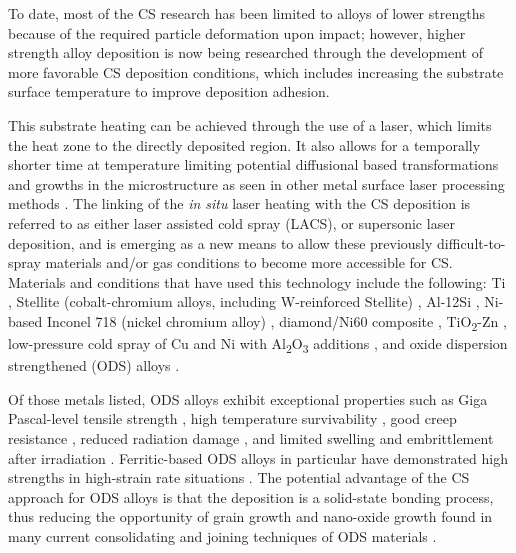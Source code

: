 	To date, most of the CS research has been limited to alloys of lower strengths because of the required particle deformation upon impact; however, higher strength alloy deposition is now being researched through the development of more favorable CS deposition conditions, which includes increasing the substrate surface temperature to improve deposition adhesion.  


	This substrate heating can be achieved through the use of a laser, which limits the heat zone to the directly deposited region. It also allows for a temporally shorter time at temperature limiting potential diffusional based transformations and growths in the microstructure as seen in other metal surface laser processing methods \cite{RN765}. The linking of the \textit{in situ} laser heating with the CS deposition is referred to as either laser assisted cold spray (LACS), or supersonic laser deposition, and is emerging as a new means to allow these previously difficult-to-spray materials and/or gas conditions to become more accessible for CS. Materials and conditions that have used this technology include the following: Ti \cite{RN765}, Stellite (cobalt-chromium alloys, including W-reinforced Stellite) \cite{RN1406,RN191}, Al-12Si \cite{RN404}, Ni-based Inconel 718 (nickel chromium alloy) \cite{RN1397}, diamond/Ni60 composite \cite{RN1407}, TiO\textsubscript{2}-Zn \cite{RN1402}, low-pressure cold spray of Cu and Ni with Al\textsubscript{2}O\textsubscript{3 }additions \cite{RN3366}, and oxide dispersion strengthened (ODS) alloys \cite{RN383}.



	Of those metals listed, ODS alloys exhibit exceptional properties such as Giga Pascal-level tensile strength \cite{RN913}, high temperature survivability \cite{RN145}, good creep resistance \cite{RN337}, reduced radiation damage \cite{RN382,RN106}, and limited swelling and embrittlement after irradiation \cite{RN1209}. Ferritic-based ODS alloys in particular have demonstrated high strengths in high-strain rate situations \cite{RN267}. The potential advantage of the CS approach for ODS alloys is that the deposition is a solid-state bonding process, thus reducing the opportunity of grain growth and nano-oxide growth found in many current consolidating and joining techniques of ODS materials \cite{RN225,RN740,RN1400,RN1253,RN252}. 



